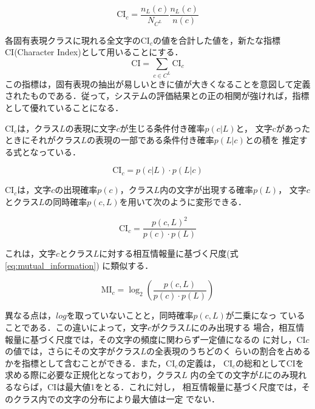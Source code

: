 \begin{equation}\label{eq:character_index_each}
\mbox{CI$_c$} = \frac{n_L(c)}{N_{C^L}} \frac{n_L(c)}{n(c)}
\end{equation}

各固有表現クラスに現れる全文字のCI$_c$の値を合計した値を，新たな指標
CI(Character Index)として用いることにする．
\begin{equation}\label{eq:character_index}
\mbox{CI} = \sum_{c \in C^L} \mbox{CI$_c$}
\end{equation}
この指標は，固有表現の抽出が易しいときに値が大きくなることを意図して定義
されたものである．従って，システムの評価結果との正の相関が強ければ，指標
として優れていることになる．

CI\(_c\)は，クラス\(L\)の表現に文字\(c\)が生じる条件付き確率\(p(c\vert L)\)と，
文字cがあったときにそれがクラス\(L\)の表現の一部である条件付き確率\(p(L\vert c)\)との積を
推定する式となっている．

\[
\mbox{CI$_c$} = p(c\vert L) \cdot p(L\vert c)
\]

CI\(_c\)は，文字\(c\)の出現確率\(p(c)\)，クラス\(L\)内の文字が出現する確率\(p(L)\)，
文字\(c\)とクラス\(L\)の同時確率\(p(c,L)\)を用いて次のように変形できる．

\[
\mbox{CI$_c$} = \frac{p(c,L)^2}{p(c) \cdot p(L)}
\]

これは，文字\(c\)とクラス\(L\)に対する相互情報量に基づく尺度(式\ref{eq:mutual_information})
に類似する．

\begin{equation}\label{eq:mutual_information}
\mbox{MI$_c$} = \log_2 \left(\frac{p(c,L)}{p(c) \cdot p(L)}\right)
\end{equation}

異なる点は，\(log\)を取っていないことと，同時確率\(p(c,L)\)が二乗になっ
ていることである．この違いによって，文字\(c\)がクラス\(L\)にのみ出現する
場合，相互情報量に基づく尺度では，その文字の頻度に関わらず一定値になるの
に対し，CI\(c\)の値では，さらにその文字がクラス\(L\)の全表現のうちどのく
らいの割合を占めるかを指標として含むことができる．また，CI\(_c\)の定義は，
CI\(_c\)の総和としてCIを求める際に必要な正規化となっており，クラス\(L\)
内の全ての文字が\(L\)にのみ現れるならば，CIは最大値1をとる．これに対し，
相互情報量に基づく尺度では，そのクラス内での文字の分布により最大値は一定
でない．


